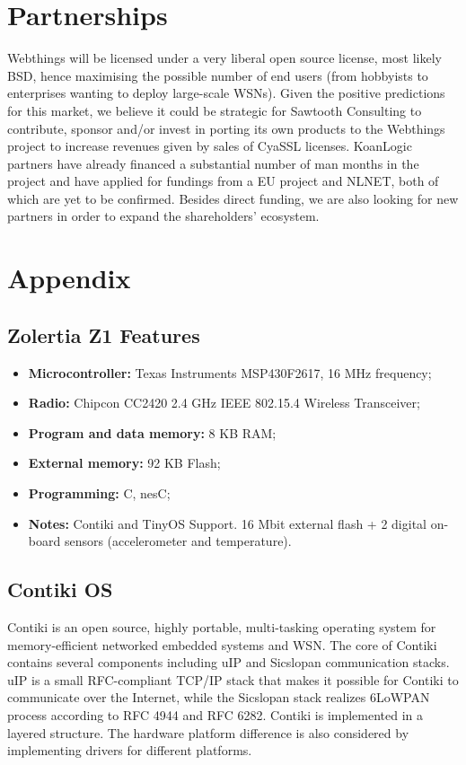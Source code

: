 \documentclass[10pt]{article}
\begin{document}
\section{Partnerships}
Webthings will be licensed under a very liberal open source license, most likely BSD, hence maximising the possible number of end users (from hobbyists to enterprises wanting to deploy large-scale WSNs). Given the positive predictions for this market, we believe it could be strategic for Sawtooth Consulting to contribute, sponsor and/or invest in porting its own products to the Webthings project to increase revenues given by sales of CyaSSL licenses. KoanLogic partners have already financed a substantial number of man months in the project and have applied for fundings from a EU project and NLNET, both of which are yet to be confirmed. Besides direct funding, we are also looking for new partners in order to expand the shareholders' ecosystem.

\section{Appendix}

\subsection{Zolertia Z1 Features}
\label{sec:z1-feats}
\begin{itemize}
  \item \textbf{Microcontroller:} Texas Instruments MSP430F2617, 16 MHz frequency;
  \item \textbf{Radio:} Chipcon CC2420 2.4 GHz IEEE 802.15.4 Wireless Transceiver;
  \item \textbf{Program and data memory:} 8 KB RAM;
  \item \textbf{External memory:} 92 KB Flash;
  \item \textbf{Programming:} C, nesC;
  \item \textbf{Notes:} Contiki and TinyOS Support. 16 Mbit external flash + 2 digital on-board sensors (accelerometer and temperature).
\end{itemize}

\subsection{Contiki OS}
Contiki is an open source, highly portable, multi-tasking operating system for memory-efficient networked embedded systems and WSN.  The core of Contiki contains several components including uIP and Sicslopan communication stacks. uIP is a small RFC-compliant TCP/IP stack that makes it possible for Contiki to communicate over the Internet, while the Sicslopan stack realizes 6LoWPAN process according to RFC 4944 and RFC 6282.  Contiki is implemented in a layered structure.  The hardware platform difference is also considered by implementing drivers for different platforms.  
\end{document}
